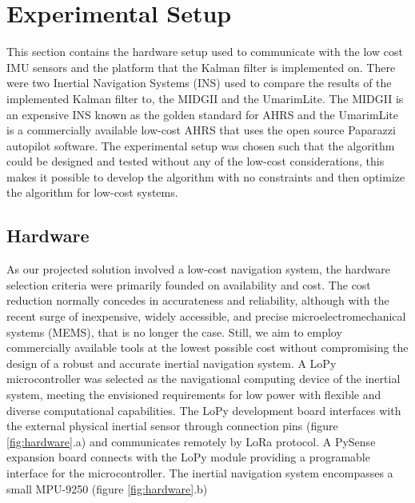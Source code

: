 \section{Experimental Setup}

This section contains the hardware setup used to communicate with the low cost IMU sensors and the platform that the Kalman filter is implemented on. There were two Inertial
Navigation Systems (INS) used to compare the results of the implemented Kalman filter to,
the MIDGII and the UmarimLite. The MIDGII is an expensive INS known as the golden
standard for AHRS and the UmarimLite is a commercially available low-cost AHRS that
uses the open source Paparazzi autopilot software. The experimental setup was chosen such
that the algorithm could be designed and tested without any of the low-cost considerations, this makes it possible to develop the algorithm with no constraints and then optimize the
algorithm for low-cost systems.

\subsection{Hardware}

As our projected solution involved a low-cost navigation system, the hardware selection criteria were primarily founded on availability and cost. The cost reduction normally concedes in accurateness and reliability, although with the recent surge of inexpensive, widely accessible, and precise microelectromechanical systems (MEMS), that is no longer the case. Still, we aim to employ commercially available tools at the lowest possible cost without compromising the design of a robust and accurate inertial navigation system. A LoPy microcontroller was selected as the navigational computing device of the inertial system, meeting the envisioned requirements for low power with flexible and diverse computational capabilities. The LoPy development board interfaces with the external physical inertial sensor through connection pins (figure \ref{fig:hardware}.a) and communicates remotely by LoRa protocol. A PySense expansion board connects with the LoPy module providing a programable interface for the microcontroller. The inertial navigation system encompasses a small MPU-9250 (figure \ref{fig:hardware}.b)

